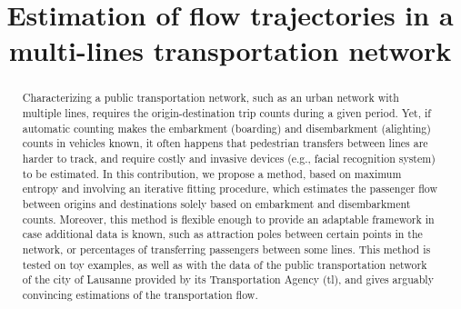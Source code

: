 \documentclass{bmcart}
\begin{document}
\begin{frontmatter}

\begin{fmbox}


\title{Estimation of flow trajectories in a multi-lines transportation network}

\author[
  addressref={aff1},                   
  corref={aff1},                       
  email={gguex@unil.ch}
]{ }
\author[
  addressref={aff2},
  email={rloup@unil.ch}
]{ }
\author[
addressref={aff1, aff2},
email={fbavaud@unil.ch}
]{ }

\address[id=aff1]{%
  ,             
  ,          
  ,                              
}
\address[id=aff2]{%
  ,
  ,          
  ,                       
}

\end{fmbox}


\begin{abstractbox}

\begin{abstract} %
Characterizing a public transportation network, such as an urban network with multiple lines, requires the origin-destination trip counts during a given period. Yet, if automatic counting makes the embarkment (boarding) and disembarkment (alighting) counts in vehicles known, it often happens that pedestrian transfers between lines are harder to track, and require costly and invasive devices (e.g., facial recognition system) to be estimated. In this contribution, we propose a method, based on maximum entropy and involving an iterative fitting procedure, which estimates the passenger flow between origins and destinations solely based on embarkment and disembarkment counts. Moreover, this method is flexible enough to provide an adaptable framework in case additional data is known, such as attraction poles between certain points in the network, or percentages of transferring passengers between some lines. This method is tested on toy examples, as well as with the data of the public transportation network of the city of Lausanne provided by its Transportation Agency (tl), and gives arguably convincing estimations of the transportation flow.
\end{abstract}


\end{abstractbox}
\end{frontmatter}
\end{document}
